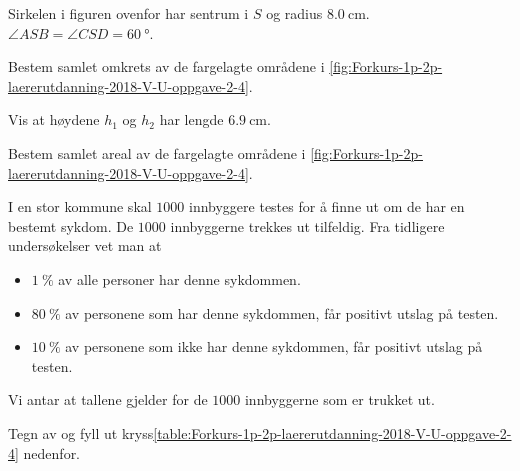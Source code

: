 Sirkelen i figuren ovenfor har sentrum i $S$ og radius $\SI{8.0}{\cm}$. \\
$\angle ASB = \angle CSD = \SI{60}{\degree}$.

\begin{oppgaver}
   Bestem samlet omkrets av de fargelagte områdene i
  \cref{fig:Forkurs-1p-2p-laererutdanning-2018-V-U-oppgave-2-4}.
\end{oppgaver}

\begin{oppgaver}
   Vis at høydene $h_1$ og $h_2$ har lengde $\SI{6.9}{\cm}$.
\end{oppgaver}

\begin{oppgaver}
   Bestem samlet areal av de fargelagte områdene i
  \cref{fig:Forkurs-1p-2p-laererutdanning-2018-V-U-oppgave-2-4}.
\end{oppgaver}


\Oppgave[6]

I en stor kommune skal $\num{1000}$ innbyggere testes for å finne ut om de har
en bestemt sykdom. De $\num{1000}$ innbyggerne trekkes ut tilfeldig. Fra
tidligere undersøkelser vet man at

\begin{itemize}
  \item $\SI{ 1}{\percent}$ av alle personer har denne sykdommen.
  \item $\SI{80}{\percent}$ av personene som har denne sykdommen, får positivt
    utslag på testen.
  \item $\SI{10}{\percent}$ av personene som ikke har denne sykdommen, får
    positivt utslag på testen.
\end{itemize}

Vi antar at tallene gjelder for de $\num{1000}$ innbyggerne som er
trukket ut.

\begin{oppgaver}
   Tegn av og fyll ut
  kryss\cref{table:Forkurs-1p-2p-laererutdanning-2018-V-U-oppgave-2-4} nedenfor.
\end{oppgaver}

